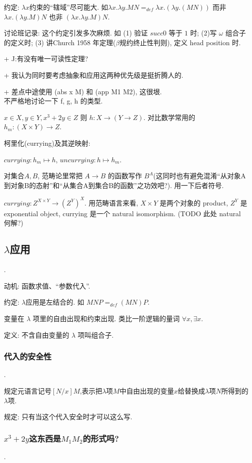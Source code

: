 \documentclass{article}
\def\b{\beta}
\def\l{\lambda}
\begin{document}
约定: $\l x$约束的``辖域''尽可能大. 如$\l x.\l y.M N =_{def} \l x.(\l y.(M N))$ 而非 $\l x.(\l y.M) N$ 也非 $(\l x.\l y.M) N$.

讨论班记录: 这个约定引发多次麻烦. 如 (1) 验证 $succ 0$ 等于 $1$ 时; (2)写 $\omega$ 组合子的定义时; (3) 讲Church 1958 年定理($\b$规约终止性判则), 定义 head position 时. 

+ J:有没有唯一可读性定理? 

+ 我认为同时要考虑抽象和应用这两种优先级是挺折腾人的.

+ 差点中途使用 (abs x M) 和 (app M1 M2), 这很垠.\\

不严格地讨论一下 f, g, h 的类型. 

$x\in X,y\in Y,x^3+2y\in Z$ 则 $h : X \to (Y \to Z)$. 对比数学常用的 $h_m : (X\times Y)\to Z$.

柯里化(currying)及其逆映射:

$currying: h_m \mapsto h$, $uncurrying: h \mapsto h_m$.

对集合$A,B$, 范畴论里常把 $A\to B$ 的函数写作 $B^A$(这同时也有避免混淆``从对象A到对象B的态射''和``从集合A到集合B的函数''之功效吧?). 用一下后者符号.

$currying: Z^{X\times Y} \to (Z^Y)^X$. 用范畴语言来看, $X\times Y$ 是两个对象的 product, $Z^Y$ 是 exponential object, currying 是一个 natural isomorphism. (TODO 此处 natural 何解?)

\subsection{$\l$应用}
.

动机: 函数求值、``参数代入''.

约定: $\l$应用是左结合的. 如 $M N P =_{def} (M N) P$.

变量在 $\l$ 项里的自由出现和约束出现. 类比一阶逻辑的量词 $\forall x, \exists x$.

定义: 不含自由变量的 $\l$ 项叫组合子.

\subsubsection{代入的安全性}
.

规定元语言记号$[N/x]M$,表示把$\l$项$M$中自由出现的变量$x$给替换成$\l$项$N$所得到的$\l$项. 

规定: 只有当这个代入安全时才可以这么写.


\subsubsection{$x^3+2y$这东西是$M_1 M_2$的形式吗?}
.
\end{document}
